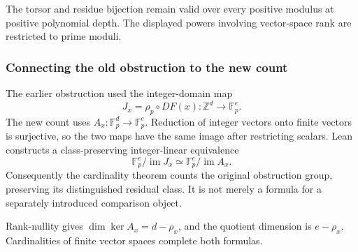 The torsor and residue bijection remain valid over every positive
modulus at positive polynomial depth. The displayed powers involving
vector-space rank are restricted to prime moduli.

\hypertarget{cont2:connecting-the-old-obstruction-to-the-new-count}{%
\subsubsection{Connecting the old obstruction to the new
count}\label{cont2:connecting-the-old-obstruction-to-the-new-count}}

The earlier obstruction used the integer-domain map \[
J_x=\rho_p\circ DF(x):\mathbb Z^d\to\mathbb F_p^e.
\] The new count uses \(A_x:\mathbb F_p^d\to\mathbb F_p^e\). Reduction
of integer vectors onto finite vectors is surjective, so the two maps
have the same image after restricting scalars. Lean constructs a
class-preserving integer-linear equivalence \[
\mathbb F_p^e/\operatorname{im}J_x
\simeq
\mathbb F_p^e/\operatorname{im}A_x.
\] Consequently the cardinality theorem counts the original obstruction
group, preserving its distinguished residual class. It is not merely a
formula for a separately introduced comparison object.

Rank-nullity gives \(\dim\ker A_x=d-\rho_x\), and the quotient dimension
is \(e-\rho_x\). Cardinalities of finite vector spaces complete both
formulas.
